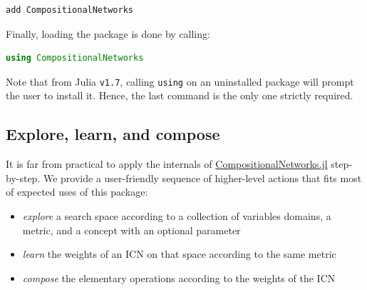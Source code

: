 \documentclass{juliacon}
\newcommand{\cnjl}{\href{https://github.com/JuliaConstraints/CompositionalNetworks.jl}{CompositionalNetworks.jl}\xspace}
\begin{document}
\begin{lstlisting}
add CompositionalNetworks
\end{lstlisting}

Finally, loading the package is done by calling:
\begin{lstlisting}[language = Julia]
using CompositionalNetworks
\end{lstlisting}

Note that from Julia \texttt{v1.7}, calling \texttt{using} on an uninstalled package will prompt the user to install it. Hence, the last command is the only one strictly required.

\subsection{Explore, learn, and compose}
\label{subsec:xlc}

It is far from practical to apply the internals of \cnjl step-by-step. We provide a user-friendly sequence of higher-level actions that fits most of expected uses of this package:
\begin{itemize}
  \item \emph{explore} a search space according to a collection of variables domains, a metric, and a concept with an optional parameter
  \item \emph{learn} the weights of an ICN on that space according to the same metric
  \item \emph{compose} the elementary operations according to the weights of the ICN
\end{itemize}
\end{document}
